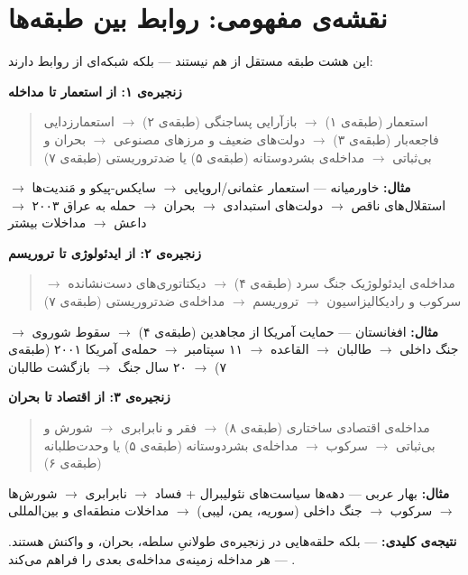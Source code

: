 \section{نقشه‌ی مفهومی: روابط بین طبقه‌ها}
\label{sec:tax-conceptual-map}

این هشت طبقه مستقل از هم نیستند — بلکه شبکه‌ای از روابط دارند:

\begin{tcolorbox}[timelinebox, title={روابط علّی و تاریخی بین طبقه‌ها}]

\textbf{زنجیره‌ی ۱: از استعمار تا مداخله}
\begin{quote}
استعمار (طبقه‌ی ۱) $\longrightarrow$
بازآرایی پساجنگی (طبقه‌ی ۲) $\longrightarrow$
استعمارزدایی فاجعه‌بار (طبقه‌ی ۳) $\longrightarrow$
دولت‌های ضعیف و مرزهای مصنوعی $\longrightarrow$
بحران و بی‌ثباتی $\longrightarrow$
مداخله‌ی بشردوستانه (طبقه‌ی ۵) یا ضدتروریستی (طبقه‌ی ۷)
\end{quote}

\textbf{مثال:} خاورمیانه —
استعمار عثمانی/اروپایی $\to$ سایکس-پیکو و مَندیت‌ها $\to$
استقلال‌های ناقص $\to$ دولت‌های استبدادی $\to$ بحران $\to$
حمله به عراق ۲۰۰۳ $\to$ داعش $\to$ مداخلات بیشتر

\tcblower

\textbf{زنجیره‌ی ۲: از ایدئولوژی تا تروریسم}
\begin{quote}
مداخله‌ی ایدئولوژیک جنگ سرد (طبقه‌ی ۴) $\longrightarrow$
دیکتاتوری‌های دست‌نشانده $\longrightarrow$
سرکوب و رادیکالیزاسیون $\longrightarrow$
تروریسم $\longrightarrow$
مداخله‌ی ضدتروریستی (طبقه‌ی ۷)
\end{quote}

\textbf{مثال:} افغانستان —
حمایت آمریکا از مجاهدین (طبقه‌ی ۴) $\to$ سقوط شوروی $\to$
جنگ داخلی $\to$ طالبان $\to$ القاعده $\to$ ۱۱ سپتامبر $\to$
حمله‌ی آمریکا ۲۰۰۱ (طبقه‌ی ۷) $\to$ ۲۰ سال جنگ $\to$ بازگشت طالبان

\tcblower

\textbf{زنجیره‌ی ۳: از اقتصاد تا بحران}
\begin{quote}
مداخله‌ی اقتصادی ساختاری (طبقه‌ی ۸) $\longrightarrow$
فقر و نابرابری $\longrightarrow$
شورش و بی‌ثباتی $\longrightarrow$
سرکوب $\longrightarrow$
مداخله‌ی بشردوستانه (طبقه‌ی ۵) یا وحدت‌طلبانه (طبقه‌ی ۶)
\end{quote}

\textbf{مثال:} بهار عربی —
دهه‌ها سیاست‌های نئولیبرال + فساد $\to$ نابرابری $\to$
شورش‌ها $\to$ سرکوب $\to$ جنگ داخلی (سوریه، یمن، لیبی) $\to$
مداخلات منطقه‌ای و بین‌المللی

\tcblower

\textbf{نتیجه‌ی کلیدی:}  — بلکه
حلقه‌هایی در زنجیره‌ی طولانیِ سلطه، بحران، و واکنش هستند. هر مداخله
زمینه‌ی مداخله‌ی بعدی را فراهم می‌کند — .
\end{tcolorbox}


